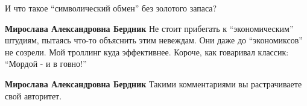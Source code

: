 \begin{itemize}
И что такое \enquote{символический обмен} без золотого запаса?


\textbf{Мирослава Александровна Бердник} Не стоит прибегать к \enquote{экономическим} штудиям,
пытаясь что-то объяснить этим невеждам. Они даже до \enquote{экономиксов} не созрели.
Мой троллинг куда эффективнее. Короче, как говаривал классик: \enquote{Мордой - и в
говно!}

\textbf{Мирослава Александровна Бердник} Такими комментариями вы растрачиваете свой авторитет.

\end{itemize}
